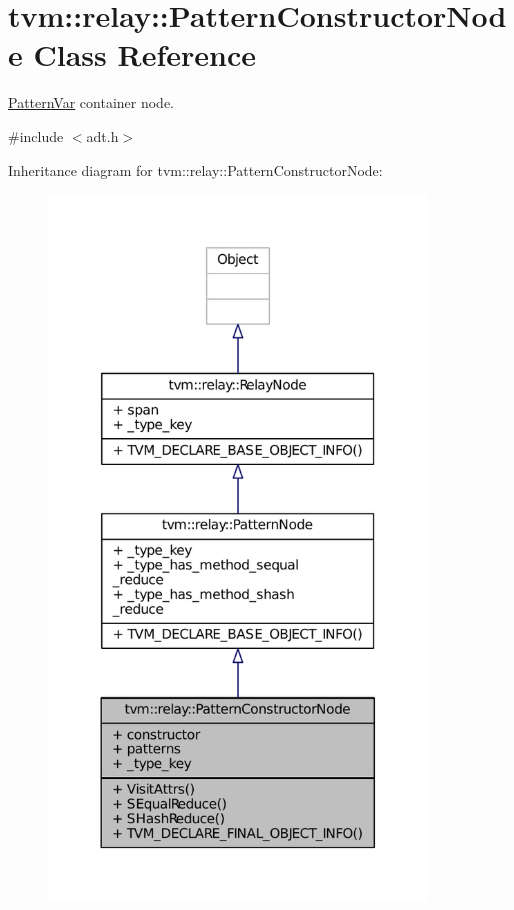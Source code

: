 \hypertarget{classtvm_1_1relay_1_1PatternConstructorNode}{}\section{tvm\+:\+:relay\+:\+:Pattern\+Constructor\+Node Class Reference}
\label{classtvm_1_1relay_1_1PatternConstructorNode}


\hyperlink{classtvm_1_1relay_1_1PatternVar}{Pattern\+Var} container node.  




{\ttfamily \#include $<$adt.\+h$>$}



Inheritance diagram for tvm\+:\+:relay\+:\+:Pattern\+Constructor\+Node\+:
\nopagebreak
\begin{figure}[H]
\begin{center}
\leavevmode
\includegraphics[width=285pt]{classtvm_1_1relay_1_1PatternConstructorNode__inherit__graph}
\end{center}
\end{figure}


